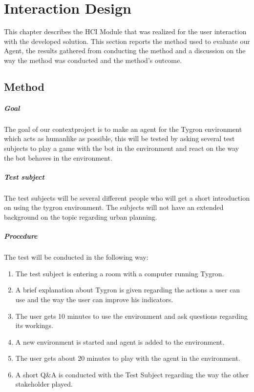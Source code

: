 \chapter{Interaction Design}
This chapter describes the HCI Module that was realized for the user interaction with the developed solution. This section reports the method used to evaluate our Agent, the results gathered from conducting the method and a discussion on the way the method was conducted and the method's outcome.

\section*{Method}

\paragraph{Goal}

The goal of our contextproject is to make an agent for the Tygron environment which acts as humanlike as possible, this will be tested by asking several test subjects to play a game with the bot in the environment and react on the way the bot behaves in the environment.

\paragraph{Test subject}

The test subjects will be several different people who will get a short introduction on using the tygron environment. The subjects will not have an extended background on the topic regarding urban planning.

\paragraph{Procedure}

The test will be conducted in the following way: 
\begin{enumerate}
\item The test subject is entering a room with a computer running Tygron.
\item A brief explanation about Tygron is given regarding the actions a user can use and the way the user can improve his indicators.
\item The user gets 10 minutes to use the environment and ask questions regarding its workings. 
\item A new environment is started and agent is added to the environment.
\item The user gets about 20 minutes to play with the agent in the environment.
\item A short Q\&A is conducted with the Test Subject regarding the way the other stakeholder played.
\end{enumerate}

